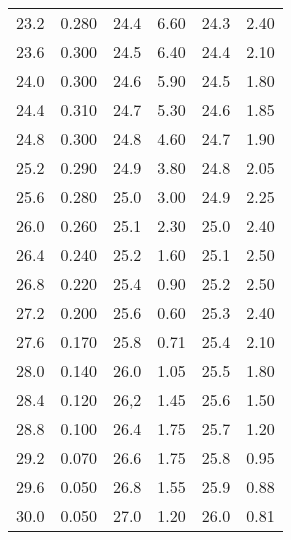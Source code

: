 \begin{longtable}{S[table-format=3.2] S[table-format=3.2] S[table-format=3.2] S[table-format=3.2] S[table-format=3.2] S[table-format=3.2]}
          23.2   &   0.280  &     24.4    &  6.60   & 24.3   &   2.40                                      \\
          23.6   &   0.300  &     24.5    &  6.40   & 24.4   &   2.10                                      \\
          24.0   &   0.300  &     24.6    &  5.90   & 24.5   &   1.80                                      \\
          24.4   &   0.310  &     24.7    &  5.30   & 24.6   &   1.85                                      \\
          24.8   &   0.300  &     24.8    &  4.60   & 24.7   &   1.90                                      \\
          25.2   &   0.290  &     24.9    &  3.80   & 24.8   &   2.05                                      \\
          25.6   &   0.280  &     25.0    &  3.00   & 24.9   &   2.25                                      \\
          26.0   &   0.260  &     25.1    &  2.30   & 25.0   &   2.40                                      \\
          26.4   &   0.240  &     25.2    &  1.60   & 25.1   &   2.50                                      \\
          26.8   &   0.220  &     25.4    &  0.90   & 25.2   &   2.50                                      \\
          27.2   &   0.200  &     25.6    &  0.60   & 25.3   &   2.40                                      \\
          27.6   &   0.170  &     25.8    &  0.71   & 25.4   &   2.10                                      \\
          28.0   &   0.140  &     26.0    &  1.05   & 25.5   &   1.80                                      \\
          28.4   &   0.120  &     26,2    &  1.45   & 25.6   &   1.50                                      \\
          28.8   &   0.100  &     26.4    &  1.75   & 25.7   &   1.20                                      \\
          29.2   &   0.070  &     26.6    &  1.75   & 25.8   &   0.95                                      \\
          29.6   &   0.050  &     26.8    &  1.55   & 25.9   &   0.88                                      \\
          30.0   &   0.050  &     27.0    &  1.20   & 26.0   &   0.81                                      \\

\end{longtable}
